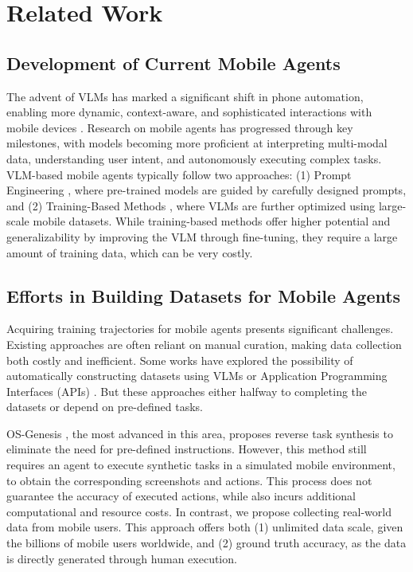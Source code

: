 \section{Related Work}
\vspace{-1mm}
\subsection{Development of Current Mobile Agents}
The advent of VLMs \cite{vlmsurver} has marked a significant shift in phone automation, enabling more dynamic, context-aware, and sophisticated interactions with mobile devices \cite{mobilesurvey}. Research on mobile agents has progressed through key milestones, with models becoming more proficient at interpreting multi-modal data, understanding user intent, and autonomously executing complex tasks. 
VLM-based mobile agents typically follow two approaches: (1) Prompt Engineering \cite{mobilegpt, lu2024omniparserpurevisionbased}, where pre-trained models are guided by carefully designed prompts, and (2) Training-Based Methods \cite{hongCogAgentVisualLanguage2023, chengSeeClickHarnessingGUI2024}, where VLMs are further optimized using large-scale mobile datasets. 
While training-based methods offer higher potential and generalizability by improving the VLM through fine-tuning, they require a large amount of training data, which can be very costly.

\vspace{-2mm}
\subsection{Efforts in Building Datasets for Mobile Agents}
Acquiring training trajectories for mobile agents presents significant challenges. 
Existing approaches are often reliant on manual curation, making data collection both costly and inefficient. Some works have explored the possibility of automatically constructing datasets using VLMs or Application Programming Interfaces (APIs) \cite{wangScreen2WordsAutomaticMobile2021, lai2024autowebglm}. 
But these approaches either halfway to completing the datasets or depend on pre-defined tasks.

OS-Genesis \cite{sunOSGenesisAutomatingGUI2024}, the most advanced in this area, proposes reverse task synthesis to eliminate the need for pre-defined instructions. However, this method still requires an agent to execute synthetic tasks in a simulated mobile environment, to obtain the corresponding screenshots and actions. 
This process does not guarantee the accuracy of executed actions, while also incurs additional computational and resource costs.
In contrast, we propose collecting real-world data from mobile users. This approach offers both (1) unlimited data scale, given the billions of mobile users worldwide, and (2) ground truth accuracy, as the data is directly generated through human execution.




%